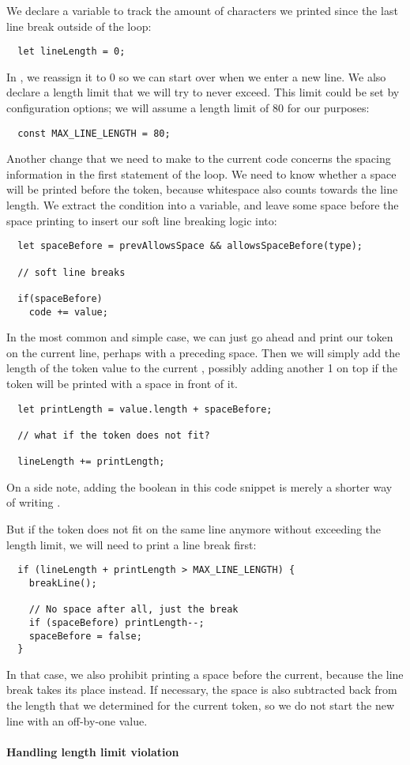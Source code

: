 We declare a variable to track the amount of characters
we printed since the last line break outside of the loop:
\begin{verbatim}
  let lineLength = 0;
\end{verbatim}
In , we reassign it to 0
so we can start over when we enter a new line.
We also declare a length limit that we will try to never exceed.
This limit could be set by configuration options;
we will assume a length limit of 80 for our purposes:
\begin{verbatim}
  const MAX_LINE_LENGTH = 80;
\end{verbatim}

Another change that we need to make to the current code
concerns the spacing information in the first statement of the loop.
We need to know whether a space will be printed before the token,
because whitespace also counts towards the line length.
We extract the condition into a variable,
and leave some space before the space printing
to insert our soft line breaking logic into:
\begin{verbatim}
  let spaceBefore = prevAllowsSpace && allowsSpaceBefore(type);

  // soft line breaks

  if(spaceBefore)
    code += value;
\end{verbatim}

In the most common and simple case,
we can just go ahead and print our token
on the current line,
perhaps with a preceding space.
Then we will simply add the length of the token value
to the current ,
possibly adding another 1 on top if
the token will be printed with a space in front of it.
\begin{verbatim}
  let printLength = value.length + spaceBefore;

  // what if the token does not fit?

  lineLength += printLength;
\end{verbatim}
On a side note, adding the boolean 
in this code snippet is merely a shorter way of
writing .

But if the token does not fit on the same line anymore
without exceeding the length limit,
we will need to print a line break first:
\begin{verbatim}
  if (lineLength + printLength > MAX_LINE_LENGTH) {
    breakLine();

    // No space after all, just the break
    if (spaceBefore) printLength--;
    spaceBefore = false;
  }
\end{verbatim}
In that case, we also prohibit printing a space before the current,
because the line break takes its place instead.
If necessary, the space is also subtracted back from the length
that we determined for the current token,
so we do not start the new line with an off-by-one  value.

\paragraph{Handling length limit violation}
